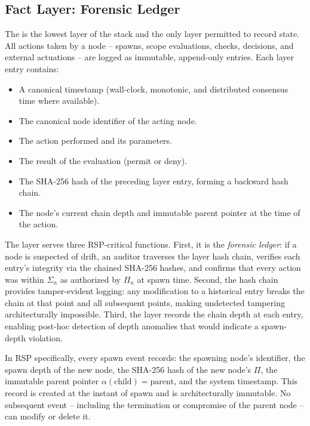 \subsection{Fact Layer: Forensic Ledger}

The \fact is the lowest layer of the \bxthree stack and the only layer permitted to record state. All actions taken by a node -- spawns, scope evaluations, \bounds checks, decisions, and external actuations -- are logged as immutable, append-only entries. Each \fact layer entry contains:

\begin{itemize}
    \setlength\itemsep{0.3em}
    \item A canonical timestamp (wall-clock, monotonic, and distributed consensus time where available).
    \item The canonical node identifier of the acting node.
    \item The action performed and its parameters.
    \item The result of the \bounds evaluation (permit or deny).
    \item The SHA-256 hash of the preceding \fact layer entry, forming a backward hash chain.
    \item The node's current chain depth and immutable parent pointer at the time of the action.
\end{itemize}

The \fact layer serves three RSP-critical functions. First, it is the \emph{forensic ledger}: if a node is suspected of drift, an auditor traverses the \fact layer hash chain, verifies each entry's integrity via the chained SHA-256 hashes, and confirms that every action was within $\Sigma_n$ as authorized by $\Pi_n$ at spawn time. Second, the hash chain provides tamper-evident logging: any modification to a historical entry breaks the chain at that point and all subsequent points, making undetected tampering architecturally impossible. Third, the \fact layer records the chain depth at each entry, enabling post-hoc detection of depth anomalies that would indicate a spawn-depth violation.

In RSP specifically, every spawn event records: the spawning node's identifier, the spawn depth of the new node, the SHA-256 hash of the new node's $\Pi$, the immutable parent pointer $\alpha(\text{child}) = \text{parent}$, and the system timestamp. This record is created at the instant of spawn and is architecturally immutable. No subsequent event -- including the termination or compromise of the parent node -- can modify or delete it.

